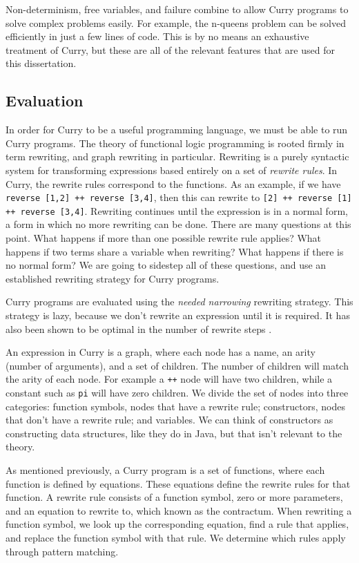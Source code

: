 Non-determinism, free variables, and failure combine to allow Curry programs to solve complex problems easily.
For example, the n-queens problem can be solved efficiently in just a few lines of code.
This is by no means an exhaustive treatment of Curry, but these are all of the relevant features that are used for this dissertation.

\subsection{Evaluation}

In order for Curry to be a useful programming language, we must be able to run Curry programs.
The theory of functional logic programming is rooted firmly in term rewriting, and graph rewriting in particular.
Rewriting is a purely syntactic system for transforming expressions based entirely on a set of \textit{rewrite rules}.
In Curry, the rewrite rules correspond to the functions.
As an example, if we have \texttt{reverse [1,2] ++ reverse [3,4]},
then this can rewrite to \texttt{[2] ++ reverse [1] ++ reverse [3,4]}.
Rewriting continues until the expression is in a normal form, a form in which no more rewriting can be done.
There are many questions at this point.  What happens if more than one possible rewrite rule applies?
What happens if two terms share a variable when rewriting?  What happens if there is no normal form?
We are going to sidestep all of these questions, and use an established rewriting strategy for Curry programs.

Curry programs are evaluated using the \textit{needed narrowing} rewriting strategy.
This strategy is lazy, because we don't rewrite an expression until it is required.
It has also been shown to be optimal in the number of rewrite steps \cite{Needed}.

An expression in Curry is a graph, where each node has a name, an arity (number of arguments),
and a set of children.
The number of children will match the arity of each node.
For example a \texttt{++} node will have two children, while a constant such as \texttt{pi} will have zero children.
We divide the set of nodes into three categories:
function symbols, nodes that have a rewrite rule; constructors, nodes that don't have a rewrite rule; and variables.
We can think of constructors as constructing data structures, like they do in Java, but that isn't relevant to the theory.

As mentioned previously, a Curry program is a set of functions, where each function is defined by equations.
These equations define the rewrite rules for that function.
A rewrite rule consists of a function symbol, zero or more parameters, and an equation to rewrite to, which known as the contractum.
When rewriting a function symbol, we look up the corresponding equation, 
find a rule that applies, and replace the function symbol with that rule.
We determine which rules apply through pattern matching.

